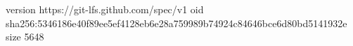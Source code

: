 version https://git-lfs.github.com/spec/v1
oid sha256:5346186e40f89ee5ef4128eb6e28a759989b74924c84646bce6d80bd5141932e
size 5648
